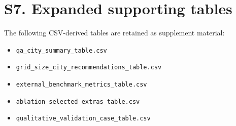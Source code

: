 \documentclass[11pt]{article}
\begin{document}
\section{S7. Expanded supporting tables}

The following CSV-derived tables are retained as supplement material:

\begin{itemize}
\item \texttt{qa\_city\_summary\_table.csv}
\item \texttt{grid\_size\_city\_recommendations\_table.csv}
\item \texttt{external\_benchmark\_metrics\_table.csv}
\item \texttt{ablation\_selected\_extras\_table.csv}
\item \texttt{qualitative\_validation\_case\_table.csv}
\end{itemize}
\end{document}
